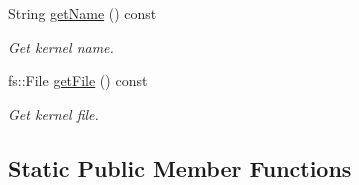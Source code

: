 \begin{DoxyCompactItemize}
String \hyperlink{classostk_1_1physics_1_1env_1_1ephem_1_1spice_1_1_kernel_ab5029446586728c69fab3c3c6e53f5f9}{get\+Name} () const
\begin{DoxyCompactList}\small\item\em Get kernel name. \end{DoxyCompactList}\item 
fs\+::\+File \hyperlink{classostk_1_1physics_1_1env_1_1ephem_1_1spice_1_1_kernel_a8f923e5079064c8e1d79e9fe275f4b0c}{get\+File} () const
\begin{DoxyCompactList}\small\item\em Get kernel file. \end{DoxyCompactList}\end{DoxyCompactItemize}
\subsection*{Static Public Member Functions}
